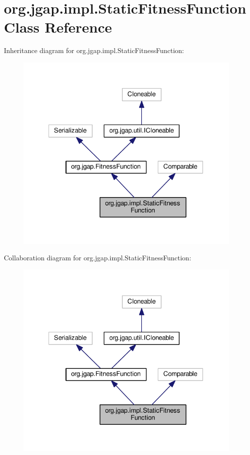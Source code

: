 \hypertarget{classorg_1_1jgap_1_1impl_1_1_static_fitness_function}{\section{org.\-jgap.\-impl.\-Static\-Fitness\-Function Class Reference}
\label{classorg_1_1jgap_1_1impl_1_1_static_fitness_function}
}


Inheritance diagram for org.\-jgap.\-impl.\-Static\-Fitness\-Function\-:
\nopagebreak
\begin{figure}[H]
\begin{center}
\leavevmode
\includegraphics[width=318pt]{classorg_1_1jgap_1_1impl_1_1_static_fitness_function__inherit__graph}
\end{center}
\end{figure}


Collaboration diagram for org.\-jgap.\-impl.\-Static\-Fitness\-Function\-:
\nopagebreak
\begin{figure}[H]
\begin{center}
\leavevmode
\includegraphics[width=318pt]{classorg_1_1jgap_1_1impl_1_1_static_fitness_function__coll__graph}
\end{center}
\end{figure}
